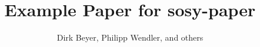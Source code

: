 \documentclass{llncs}
\title{Example Paper for sosy-paper}
\author{Dirk Beyer, Philipp Wendler, and others}
\institute{LMU Munich, Germany}
\begin{document}
\maketitle

\begin{abstract}
%
\end{abstract}

%
%
%

%


\end{document}
